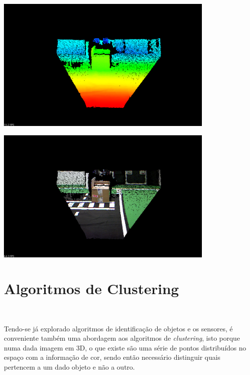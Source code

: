 \begin{center}
	\includegraphics[width=0.80\textwidth]{figures/pcl_openni.png}
	\label{fig:pcl_depth}
	
\end{center}

\begin{center}
	\includegraphics[width=0.80\textwidth]{figures/pcl_color.png}
	\label{fig:pcl_color}
	
\end{center}


\section{Algoritmos de Clustering}~\label{sec:clustering}

Tendo-se já explorado algoritmos de identificação de objetos e os sensores, é conveniente também uma abordagem aos algoritmos de \emph{clustering}, isto porque numa dada imagem em 3D, o que existe são uma série de pontos distribuídos no espaço com a informação de cor, sendo então necessário distinguir quais pertencem a um dado objeto e não a outro.

